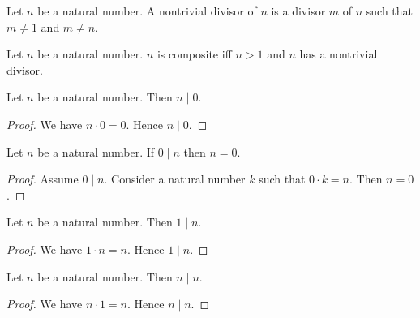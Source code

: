 \documentclass[10pt]{article}
\begin{document}
  \begin{forthel}
    \begin{definition}
      Let $n$ be a natural number.
      A nontrivial divisor of $n$ is a divisor $m$ of $n$ such that $m \neq 1$ and $m \neq n$.
    \end{definition}
  \end{forthel}

  \begin{forthel}
    \begin{definition}
      Let $n$ be a natural number.
      $n$ is composite iff $n > 1$ and $n$ has a nontrivial divisor.
    \end{definition}
  \end{forthel}

  \begin{forthel}
    \begin{proposition}
      Let $n$ be a natural number.
      Then $n \mid 0$.
    \end{proposition}
    \begin{proof}
      We have $n \cdot 0 = 0$.
      Hence $n \mid 0$.
    \end{proof}
  \end{forthel}

  \begin{forthel}
    \begin{proposition}
      Let $n$ be a natural number.
      If $0 \mid n$ then $n = 0$.
    \end{proposition}
    \begin{proof}
      Assume $0 \mid n$.
      Consider a natural number $k$ such that $0 \cdot k = n$.
      Then $n = 0$.
    \end{proof}
  \end{forthel}

  \begin{forthel}
    \begin{proposition}
      Let $n$ be a natural number.
      Then $1 \mid n$.
    \end{proposition}
    \begin{proof}
      We have $1 \cdot n = n$.
      Hence $1 \mid n$.
    \end{proof}
  \end{forthel}

  \begin{forthel}
    \begin{proposition}
      Let $n$ be a natural number.
      Then $n \mid n$.
    \end{proposition}
    \begin{proof}
      We have $n \cdot 1 = n$.
      Hence $n \mid n$.
    \end{proof}
  \end{forthel}
\end{document}
